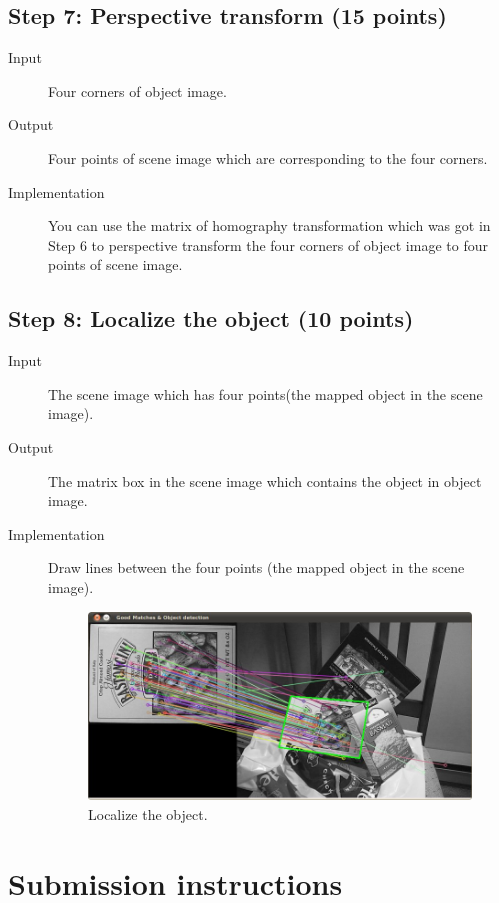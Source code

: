 \documentclass[12pt]{article}
\begin{document}
\subsection{Step 7: Perspective transform (15 points)}

\begin{description}
\item[Input] Four corners of object image.
\item[Output] Four points of scene image which are corresponding to the four corners.
\item[Implementation] You can use the matrix of homography transformation which was got in Step 6 to perspective transform the four corners of object image to four points of scene image.
\end{description}

\subsection{Step 8: Localize the object (10 points)}

\begin{description}
\item[Input] The scene image which has four points(the mapped object in the scene image).
\item[Output] The matrix box in the scene image which contains the object in object image.
\item[Implementation] Draw lines between the four points (the mapped object in the scene image).
\begin{figure}[!ht]
\centering
\includegraphics[height=0.3\textheight]{Result.jpg}
\caption{Localize the object.}
\label{fig: Localize the object}
\end{figure}
\end{description}


\section{Submission instructions}
\end{document}
